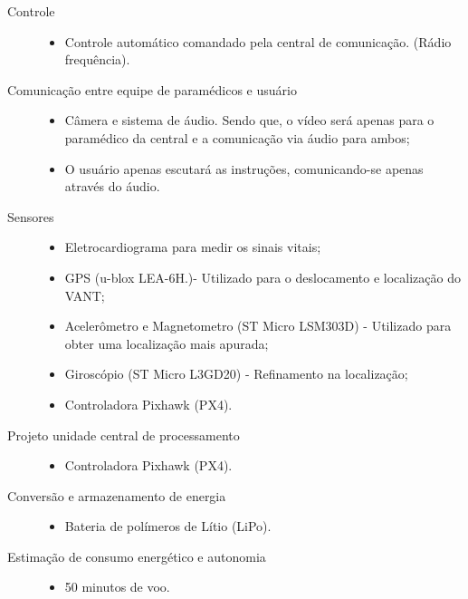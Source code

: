 \begin{description}
\begin{itemize}
  	\end{itemize}
  \item[Controle] \hfill 
  	\begin{itemize}
  		\item Controle automático comandado pela central de comunicação. (Rádio frequência).
  	\end{itemize}
  \item[Comunicação entre equipe de paramédicos e usuário] \hfill 
  	\begin{itemize}
  		\item Câmera e sistema de áudio. Sendo que, o vídeo será apenas para o paramédico da central e a comunicação via áudio para ambos;
  		\item O usuário apenas escutará as instruções, comunicando-se apenas através do áudio.
  	\end{itemize}
  \item[Sensores] \hfill 
  	\begin{itemize}
  		\item Eletrocardiograma para medir os sinais vitais;
		\item GPS (u-blox LEA-6H.)- Utilizado para o deslocamento e localização do VANT;
		\item Acelerômetro e Magnetometro (ST Micro LSM303D) - Utilizado para obter uma localização mais apurada;
		\item Giroscópio (ST Micro L3GD20) - Refinamento na localização;
		\item Controladora Pixhawk (PX4).
  	\end{itemize}
  \item[Projeto unidade central de processamento] \hfill 
  	\begin{itemize}
  		\item Controladora Pixhawk (PX4).
  	\end{itemize}
  \item[Conversão e armazenamento de energia] \hfill 
  	\begin{itemize}
  		\item Bateria de polímeros de Lítio (LiPo).
  	\end{itemize}
  \item[Estimação de consumo energético e autonomia] \hfill 
  	\begin{itemize}
  		\item 50 minutos de voo.
  	\end{itemize}
\end{description}

